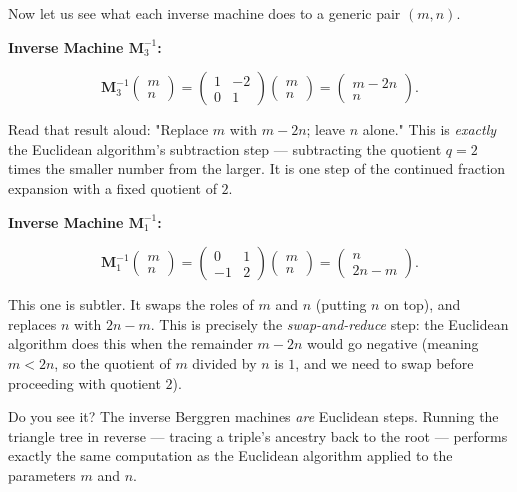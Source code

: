 \documentclass[11pt,openany]{book}
\theoremstyle{definition}
\theoremstyle{plain}
\theoremstyle{remark}
\begin{document}
Now let us see what each inverse machine does to a generic pair $(m, n)$.

\textbf{Inverse Machine $\mathbf{M}_3^{-1}$:}

\[
\mathbf{M}_3^{-1} \begin{pmatrix} m \\ n \end{pmatrix} = \begin{pmatrix} 1 & -2 \\ 0 & 1 \end{pmatrix} \begin{pmatrix} m \\ n \end{pmatrix} = \begin{pmatrix} m - 2n \\ n \end{pmatrix}.
\]


Read that result aloud: "Replace $m$ with $m - 2n$; leave $n$ alone." This is \textit{exactly} the Euclidean algorithm's subtraction step — subtracting the quotient $q = 2$ times the smaller number from the larger. It is one step of the continued fraction expansion with a fixed quotient of $2$.

\textbf{Inverse Machine $\mathbf{M}_1^{-1}$:}

\[
\mathbf{M}_1^{-1} \begin{pmatrix} m \\ n \end{pmatrix} = \begin{pmatrix} 0 & 1 \\ -1 & 2 \end{pmatrix} \begin{pmatrix} m \\ n \end{pmatrix} = \begin{pmatrix} n \\ 2n - m \end{pmatrix}.
\]


This one is subtler. It swaps the roles of $m$ and $n$ (putting $n$ on top), and replaces $n$ with $2n - m$. This is precisely the \textit{swap-and-reduce} step: the Euclidean algorithm does this when the remainder $m - 2n$ would go negative (meaning $m < 2n$, so the quotient of $m$ divided by $n$ is $1$, and we need to swap before proceeding with quotient $2$).

Do you see it? The inverse Berggren machines \textit{are} Euclidean steps. Running the triangle tree in reverse — tracing a triple's ancestry back to the root — performs exactly the same computation as the Euclidean algorithm applied to the parameters $m$ and $n$.
\end{document}
